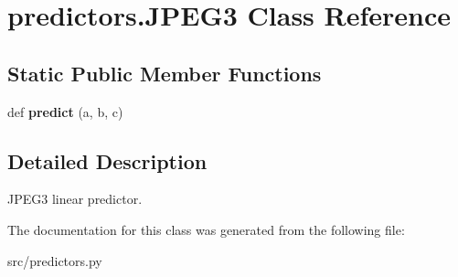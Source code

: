 \hypertarget{classpredictors_1_1JPEG3}{}\section{predictors.\+J\+P\+E\+G3 Class Reference}
\label{classpredictors_1_1JPEG3}
\subsection*{Static Public Member Functions}
\begin{DoxyCompactItemize}
\item 
\mbox{\label{classpredictors_1_1JPEG3_a79cf31dd6d44c8522aa8d7e4cc4fbfb8}} 
def {\bfseries predict} (a, b, c)
\end{DoxyCompactItemize}


\subsection{Detailed Description}
\begin{DoxyVerb}JPEG3 linear predictor.
\end{DoxyVerb}
 

The documentation for this class was generated from the following file\+:\begin{DoxyCompactItemize}
\item 
src/predictors.\+py\end{DoxyCompactItemize}
